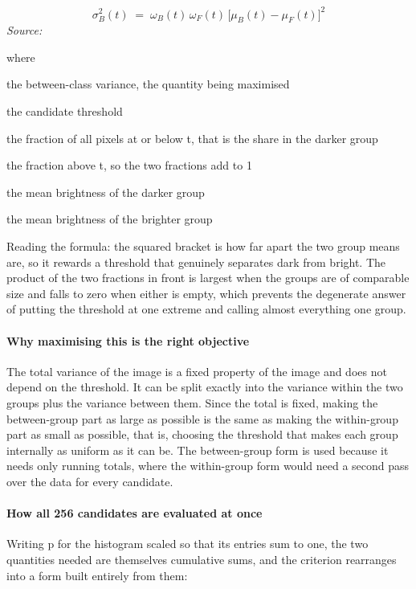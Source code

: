 \begin{equation}
\sigma_B^2(t) \;=\; \omega_B(t)\,\omega_F(t)\,\big[\mu_B(t) - \mu_F(t)\big]^2
\end{equation}
\noindent\emph{Source: }\cite{otsu1979}


\noindent where
\begin{description}[leftmargin=2.4em,style=nextline,font=\normalfont\ttfamily]\setlength\itemsep{1pt}
  \item[{$\sigma_B^2(t)$}] \normalfont the between-class variance, the quantity being maximised
  \item[{$t$}] \normalfont the candidate threshold
  \item[{$\omega_B(t)$}] \normalfont the fraction of all pixels at or below t, that is the share in the darker group
  \item[{$\omega_F(t)$}] \normalfont the fraction above t, so the two fractions add to 1
  \item[{$\mu_B(t)$}] \normalfont the mean brightness of the darker group
  \item[{$\mu_F(t)$}] \normalfont the mean brightness of the brighter group
\end{description}
Reading the formula: the squared bracket is how far apart the two group means are, so it rewards a threshold that genuinely separates dark from bright. The product of the two fractions in front is largest when the groups are of comparable size and falls to zero when either is empty, which prevents the degenerate answer of putting the threshold at one extreme and calling almost everything one group.


\paragraph{Why maximising this is the right objective}
The total variance of the image is a fixed property of the image and does not depend on the threshold. It can be split exactly into the variance within the two groups plus the variance between them. Since the total is fixed, making the between-group part as large as possible is the same as making the within-group part as small as possible, that is, choosing the threshold that makes each group internally as uniform as it can be. The between-group form is used because it needs only running totals, where the within-group form would need a second pass over the data for every candidate.


\paragraph{How all 256 candidates are evaluated at once}
Writing p for the histogram scaled so that its entries sum to one, the two quantities needed are themselves cumulative sums, and the criterion rearranges into a form built entirely from them:


